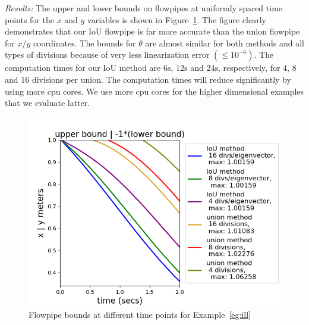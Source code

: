 \emph{Results:}  The upper and lower bounds on flowpipes at uniformly spaced time
points for the $x$ and $y$ variables is
shown in Figure~\ref{fig:ill}.  The figure clearly demonstrates that our IoU
flowpipe is far more accurate than the union flowpipe for $x/y$
coordinates.  The bounds for $\theta$ are almost similar for both
methods and all types of divisions because of very less linearization
error $(\le 10^{-6})$.  The computation times for our IoU method are $6\si{\second}$, $12\si{\second}$ and $24\si{\second}$, respectively, for $4$, $8$ and $16$ divisions
per union.  The computation times will reduce significantly by using
more cpu cores.  We use more cpu cores for the higher dimensional
examples that we evaluate latter.
%
\begin{figure}
  \includegraphics[scale = 0.7]{illImages/Ub.png}
  \caption{Flowpipe bounds at different time points for
    Example~\ref{eg:ill}}
  \label{fig:ill}
\end{figure}
%
